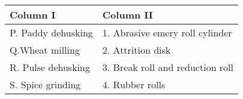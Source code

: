 \begin{center}
\begin{tabular}{|l|l|}
\hline
\textbf{Column I} &  \textbf{Column II} \\ \hline
P. Paddy dehusking   & 1. Abrasive emery roll cylinder \\ \hline
Q.Wheat milling     & 2. Attrition disk \\ \hline
R. Pulse dehusking   & 3. Break roll and reduction roll \\ \hline
S. Spice grinding    & 4. Rubber rolls \\ \hline
\end{tabular}
\end{center}
